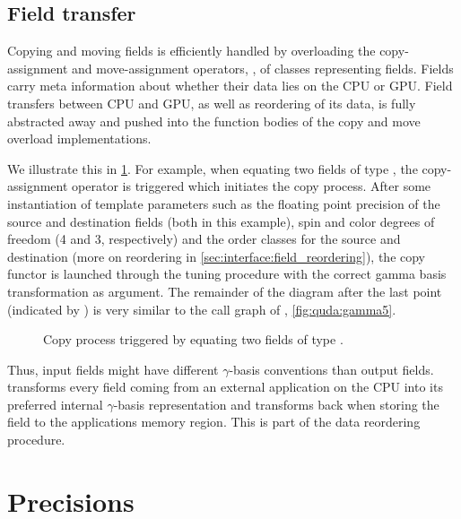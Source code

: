\subsection{Field transfer}

Copying and moving fields is efficiently handled by overloading the copy-assignment and move-assignment operators, , of classes representing fields.
Fields carry meta information about whether their data lies on the CPU or GPU.
Field transfers between CPU and GPU, as well as reordering of its data, is fully abstracted away and pushed into the function bodies of the copy and move overload implementations.


We illustrate this in \cref{fig:quda:copy}.
For example, when equating two fields of type , the copy-assignment operator is triggered which initiates the copy process.
After some instantiation of template parameters such as the floating point precision of the source  and destination  fields (both  in this example), spin and color degrees of freedom (\num{4} and \num{3}, respectively) and the order classes for the source and destination (more on reordering in \cref{sec:interface:field_reordering}), the copy functor  is launched through the tuning procedure with the correct gamma basis transformation as argument.
The remainder of the diagram after the last point (indicated by ) is very similar to the call graph of , \cref{fig:quda:gamma5}.
\begin{figure}
  
  \caption{Copy process triggered by equating two fields of type .}
  \label{fig:quda:copy}
\end{figure}

Thus, input fields might have different $\gamma$-basis conventions than output fields.
\Quda transforms every field coming from an external application on the CPU into its preferred internal $\gamma$-basis representation and transforms back when storing the field to the applications memory region.
This is part of the data reordering procedure.

\section{Precisions}
\label{sec:quda:precision}

